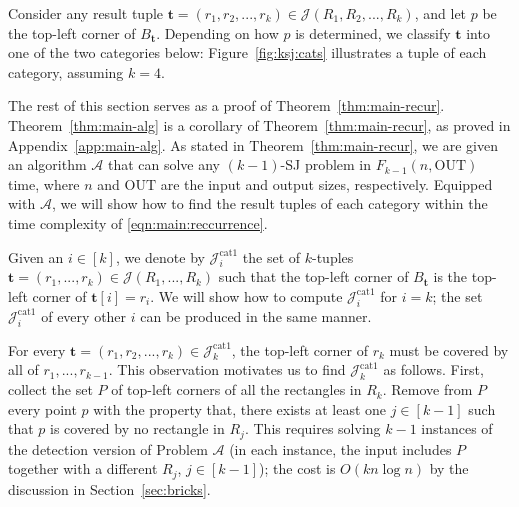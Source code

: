 \documentclass[acmsmall,review,anonymous]{acmart}
\def\vgap{\vspace{1mm}}
\def\extraspacing{\vspace{2mm} \noindent}
\def\A{\mathcal{A}}
\def\J{\mathcal{J}}
\def\cat{\mathrm{cat1}}
\def\out{\mathrm{OUT}}
\begin{document}
{{{\vgap 

Consider any result tuple $\bm{t} = (r_1, r_2, ..., r_k) \in \J(R_1, R_2, ..., R_k)$, and let $p$ be the top-left corner of $B_\bm{t}$. Depending on how $p$ is determined, we classify $\bm{t}$ into one of the two categories below: 
Figure~\ref{fig:ksj:cats} illustrates a tuple of each category, assuming $k=4$. 

\vgap

The rest of this section serves as a proof of Theorem~\ref{thm:main-recur}. Theorem~\ref{thm:main-alg} is a corollary of Theorem~\ref{thm:main-recur}, as proved in Appendix~\ref{app:main-alg}. As stated in Theorem~\ref{thm:main-recur}, we are given an algorithm $\A$ that can solve any $(k-1)$-SJ problem in $F_{k-1}(n, \out)$ time, where $n$ and $\out$ are the input and output sizes, respectively. Equipped with $\A$, we will show how to find the result tuples of each category within the time complexity of \eqref{eqn:main:reccurrence}.

\extraspacing {\bf Category 1.} Given an $i \in [k]$, we denote by $\J^\cat_i$ the set of $k$-tuples $\bm{t} = (r_1, ..., r_k) \in \J(R_1, ..., R_k)$ such that the top-left corner of $B_\bm{t}$ is the top-left corner of $\bm{t}[i] = r_i$. We will show how to compute $\J^\cat_i$ for $i = k$; the set $\J^\cat_i$ of every other $i$ can be produced in the same manner.

\vgap 

For every $\bm{t} = (r_1, r_2, ..., r_k) \in \J^\cat_k$, the top-left corner of $r_k$ must be covered by all of $r_1, ..., r_{k-1}$. This observation motivates us to find $\J^\cat_k$ as follows. First, collect the set $P$ of top-left corners of all the rectangles in $R_k$. Remove from $P$ every point $p$ with the property that, there exists at least one $j \in [k-1]$ such that $p$ is covered by no rectangle in $R_j$. This requires solving $k-1$ instances of the detection version of Problem $\mathscr{A}$ (in each instance, the input includes $P$ together with a different $R_j$, $j \in [k-1]$); the cost is $O(k n \log n)$ by the discussion in Section~\ref{sec:bricks}.

}}}
\end{document}
